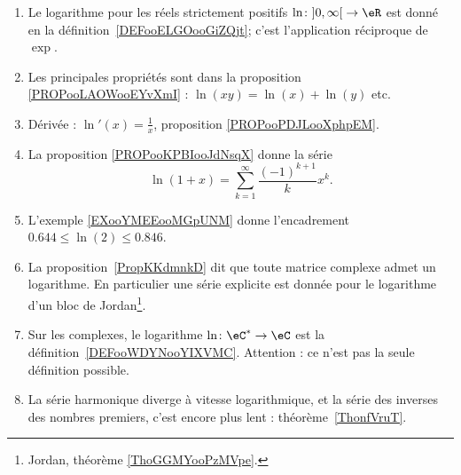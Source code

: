 
\begin{enumerate}
	\item
	      Le logarithme pour les réels strictement positifs \( \ln\colon \mathopen] 0 , \infty \mathclose[\to \eR\) est donné en la définition~\ref{DEFooELGOooGiZQjt}; c'est l'application réciproque de \( \exp\).
	\item
	      Les principales propriétés sont dans la proposition \ref{PROPooLAOWooEYvXmI} : \( \ln(xy)=\ln(x)+\ln(y)\) etc.
	\item
	      Dérivée : \( \ln'(x)=\frac{1}{ x }\), proposition \ref{PROPooPDJLooXphpEM}.
	\item
	      La proposition \ref{PROPooKPBIooJdNsqX} donne la série
	      \begin{equation}
		      \ln(1+x)=\sum_{k=1}^{\infty}\frac{ (-1)^{k+1} }{ k }x^k.
	      \end{equation}
	\item
	      L'exemple \ref{EXooYMEEooMGpUNM} donne l'encadrement \( 0.644\leq \ln(2)\leq 0.846\).
	\item
	      La proposition~\ref{PropKKdmnkD} dit que toute matrice complexe admet un logarithme. En particulier une série explicite est donnée pour le logarithme d'un bloc de Jordan\footnote{Jordan, théorème \ref{ThoGGMYooPzMVpe}.}.
	\item
	      Sur les complexes, le logarithme \( \ln \colon \eC^*\to \eC\) est la définition~\ref{DEFooWDYNooYIXVMC}. Attention : ce n'est pas la seule définition possible.
	\item
	      La série harmonique diverge à vitesse logarithmique, et la série des inverses des nombres premiers, c'est encore plus lent : théorème~\ref{ThonfVruT}.
\end{enumerate}

